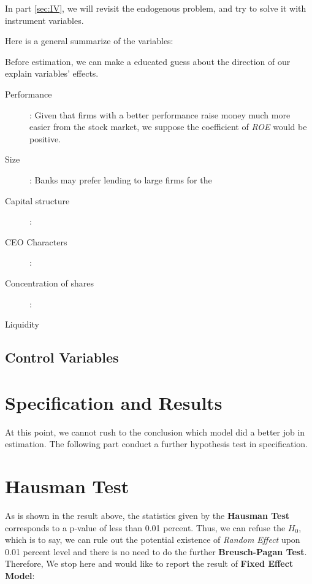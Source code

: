 \documentclass{article}
\begin{document}
In part \ref{sec:IV}, we will revisit the endogenous problem, and try to solve it with instrument variables.

Here is a general summarize of the variables:


Before estimation, we can make a educated guess about the direction of our explain variables' effects. 
\begin{description}
\item [Performance]: Given that firms with a better performance raise money much more easier from the stock market, we suppose the coefficient of {\it ROE} would be positive. 
\item [Size]: Banks may prefer lending to large firms for the 	
\item []
\item [Capital structure]:
\item [CEO Characters]:
\item [Concentration of shares]:
\item [Liquidity]
\end{description}
\subsection{Control Variables}
\newpage
\section{Specification and Results} \label{sec:model}

At this point, we cannot rush to the conclusion which model did a better job in estimation. The following part conduct a further hypothesis test in specification.

\newpage
\section{Hausman Test}\label{sec:test}
\begin{center}
	\begin{stlog}
	\nullskip
	\end{stlog}
\end{center}
As is shown in the result above, the statistics given by the {\bf Hausman Test} corresponds to a p-value of less than 0.01 percent. Thus, we can refuse the $H_0$, which is to say, we can rule out the potential existence of {\it Random Effect} upon 0.01 percent level and there is no need to do the further {\bf Breusch-Pagan Test}. 
Therefore, We stop here and would like to report the result of {\bf Fixed Effect Model}:

\end{document}

